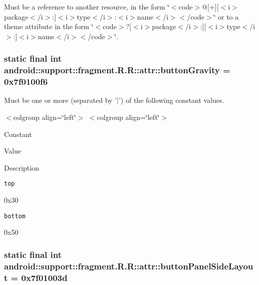 Must be a reference to another resource, in the form \char`\"{}$<$code$>$@\mbox{[}+\mbox{]}\mbox{[}$<$i$>$package$<$/i$>$:\mbox{]}$<$i$>$type$<$/i$>$:$<$i$>$name$<$/i$>$$<$/code$>$\char`\"{} or to a theme attribute in the form \char`\"{}$<$code$>$?\mbox{[}$<$i$>$package$<$/i$>$:\mbox{]}\mbox{[}$<$i$>$type$<$/i$>$:\mbox{]}$<$i$>$name$<$/i$>$$<$/code$>$\char`\"{}. \hypertarget{classandroid_1_1support_1_1fragment_1_1_r_1_1attr_327f6036bf1b6d0ce80c71cc41d630af}{
\subsubsection[{buttonGravity}]{\setlength{\rightskip}{0pt plus 5cm}static final int android::support::fragment.R.R::attr::buttonGravity = 0x7f0100f6}}
\label{classandroid_1_1support_1_1fragment_1_1_r_1_1attr_327f6036bf1b6d0ce80c71cc41d630af}


Must be one or more (separated by '$|$') of the following constant values. \begin{TabularC}{0}
\hline
\end{TabularC}
$<$colgroup align=\char`\"{}left\char`\"{}$>$ $<$colgroup align=\char`\"{}left\char`\"{}$>$ 

Constant

Value

Description 

{\tt top}

0x30

{\tt bottom}

0x50\hypertarget{classandroid_1_1support_1_1fragment_1_1_r_1_1attr_f835a3ba20fe6da8baa06f6ee0f8f61e}{
\subsubsection[{buttonPanelSideLayout}]{\setlength{\rightskip}{0pt plus 5cm}static final int android::support::fragment.R.R::attr::buttonPanelSideLayout = 0x7f01003d}}
\label{classandroid_1_1support_1_1fragment_1_1_r_1_1attr_f835a3ba20fe6da8baa06f6ee0f8f61e}


